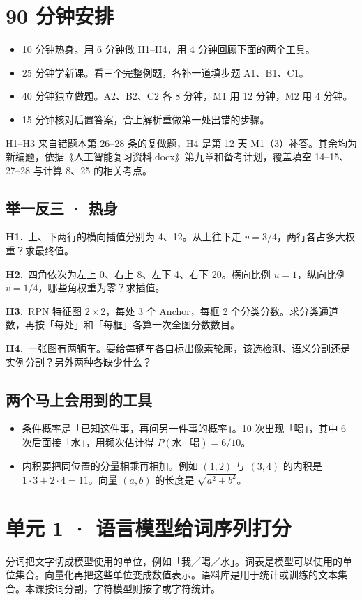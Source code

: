 \documentclass[UTF8,a4paper,11pt]{ctexart}
\newcommand{\PracticeQuestion}[3]{\par\Needspace{4\baselineskip}\noindent\begin{minipage}{\linewidth}\textbf{#1.}\ #2\par\noindent\rule{0pt}{#3mm}\par\end{minipage}\par}
\begin{document}
\section{90 分钟安排}
\begin{itemize}
\item 10 分钟热身。用 6 分钟做 H1–H4，用 4 分钟回顾下面的两个工具。
\item 25 分钟学新课。看三个完整例题，各补一道填步题 A1、B1、C1。
\item 40 分钟独立做题。A2、B2、C2 各 8 分钟，M1 用 12 分钟，M2 用 4 分钟。
\item 15 分钟核对后置答案，合上解析重做第一处出错的步骤。
\end{itemize}
H1–H3 来自错题本第 26–28 条的复做题，H4 是第 12 天 M1（3）补答。其余均为新编题，依据《人工智能复习资料.docx》第九章和备考计划，覆盖填空 14–15、27–28 与计算 8、25 的相关考点。

\subsection{举一反三 · 热身}
\PracticeQuestion{H1}{上、下两行的横向插值分别为 4、12。从上往下走 $v=3/4$，两行各占多大权重？求最终值。}{13}
\PracticeQuestion{H2}{四角依次为左上 0、右上 8、左下 4、右下 20。横向比例 $u=1$，纵向比例 $v=1/4$，哪些角权重为零？求插值。}{13}
\PracticeQuestion{H3}{RPN 特征图 $2\times2$，每处 3 个 Anchor，每框 2 个分类分数。求分类通道数，再按「每处」和「每框」各算一次全图分数数目。}{13}
\PracticeQuestion{H4}{一张图有两辆车。要给每辆车各自标出像素轮廓，该选检测、语义分割还是实例分割？另外两种各缺少什么？}{13}
\subsection{两个马上会用到的工具}
\begin{itemize}
\item 条件概率是「已知这件事，再问另一件事的概率」。10 次出现「喝」，其中 6 次后面接「水」，用频次估计得 $P(\text{水}\mid\text{喝})=6/10$。
\item 内积要把同位置的分量相乘再相加。例如 $(1,2)$ 与 $(3,4)$ 的内积是 $1\cdot3+2\cdot4=11$。向量 $(a,b)$ 的长度是 $\sqrt{a^2+b^2}$。
\end{itemize}
\clearpage
\section{单元 1 · 语言模型给词序列打分}
分词把文字切成模型使用的单位，例如「我／喝／水」。词表是模型可以使用的单位集合。向量化再把这些单位变成数值表示。语料库是用于统计或训练的文本集合。本课按词分割，字符模型则按字或字符统计。
\end{document}

